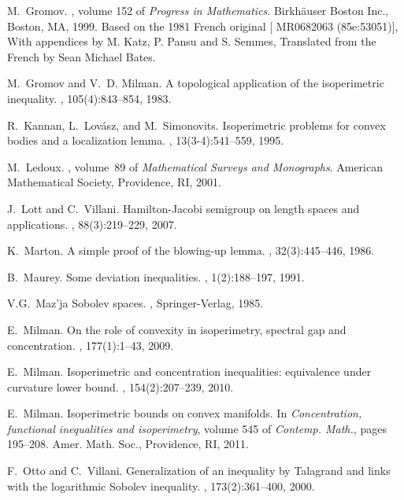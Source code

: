 \documentclass[11pt]{amsart}
\numberwithin{equation}{section}
\begin{document}
\begin{thebibliography}{10}
M.~Gromov.
,
  volume 152 of {\em Progress in Mathematics}.
\newblock Birkh\"auser Boston Inc., Boston, MA, 1999.
\newblock Based on the 1981 French original [ MR0682063 (85e:53051)], With
  appendices by M. Katz, P. Pansu and S. Semmes, Translated from the French by
  Sean Michael Bates.

M.~Gromov and V.~D. Milman.
\newblock A topological application of the isoperimetric inequality.
, 105(4):843--854, 1983.

R.~Kannan, L.~Lov{\'a}sz, and M.~Simonovits.
\newblock Isoperimetric problems for convex bodies and a localization lemma.
, 13(3-4):541--559, 1995.

M.~Ledoux.
, volume~89 of {\em
  Mathematical Surveys and Monographs}.
\newblock American Mathematical Society, Providence, RI, 2001.

J.~Lott and C.~Villani.
\newblock Hamilton-{J}acobi semigroup on length spaces and applications.
, 88(3):219--229, 2007.

K.~Marton.
\newblock A simple proof of the blowing-up lemma.
, 32(3):445--446, 1986.

B.~Maurey.
\newblock Some deviation inequalities.
, 1(2):188--197, 1991.

V.G.~Maz'ja
\newblock Sobolev spaces.
, Springer-Verlag, 1985.

E.~Milman.
\newblock On the role of convexity in isoperimetry, spectral gap and
  concentration.
, 177(1):1--43, 2009.

E.~Milman.
\newblock Isoperimetric and concentration inequalities: equivalence under
  curvature lower bound.
, 154(2):207--239, 2010.

E.~Milman.
\newblock Isoperimetric bounds on convex manifolds.
\newblock In {\em Concentration, functional inequalities and isoperimetry},
  volume 545 of {\em Contemp. Math.}, pages 195--208. Amer. Math. Soc.,
  Providence, RI, 2011.

F.~Otto and C.~Villani.
\newblock Generalization of an inequality by {T}alagrand and links with the
  logarithmic {S}obolev inequality.
, 173(2):361--400, 2000.


\end{thebibliography}
\end{document}
